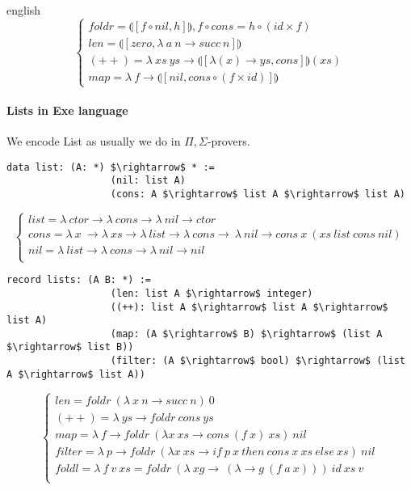 \documentclass{abstract}
\begin{document}
\begin{theses}{english}
$$
\begin{cases}
 foldr = \llparenthesis [ f \circ nil , h] \rrparenthesis, f \circ cons = h \circ (id \times f)\\
 len = \llparenthesis [ zero, \lambda\ a\ n \rightarrow succ\ n ] \rrparenthesis \\
 (++) = \lambda\ xs\ ys \rightarrow \llparenthesis [ \lambda (x) \rightarrow ys, cons ] \rrparenthesis (xs) \\
 map = \lambda\ f \rightarrow \llparenthesis [ nil, cons \circ (f \times id)] \rrparenthesis
\end{cases}
$$

  \paragraph{Lists in Exe language}
  
  We encode List as usually we do in $\Pi,\Sigma$-provers.

\begin{lstlisting}[mathescape=true]
             data list: (A: *) $\rightarrow$ * :=
                  (nil: list A)
                  (cons: A $\rightarrow$ list A $\rightarrow$ list A)
\end{lstlisting}

$$
\begin{cases}
list = \lambda\ ctor \rightarrow \lambda\ cons \rightarrow \lambda\ nil \rightarrow ctor\\
cons = \lambda\ x\ \rightarrow \lambda\ xs \rightarrow \lambda\ list \rightarrow \lambda\ cons \rightarrow\ \lambda\ nil \rightarrow cons\ x\ (xs\ list\ cons\ nil)\\
nil = \lambda\ list \rightarrow \lambda\ cons \rightarrow \lambda\ nil \rightarrow nil\\
\end{cases}
$$

\begin{lstlisting}[mathescape=true]
           record lists: (A B: *) :=
                  (len: list A $\rightarrow$ integer)
                  ((++): list A $\rightarrow$ list A $\rightarrow$ list A)
                  (map: (A $\rightarrow$ B) $\rightarrow$ (list A $\rightarrow$ list B))
                  (filter: (A $\rightarrow$ bool) $\rightarrow$ (list A $\rightarrow$ list A))
\end{lstlisting}
$$
\begin{cases}
len = foldr\ (\lambda\ x\ n \rightarrow succ\ n)\ 0\\
(++) = \lambda\ ys \rightarrow foldr\ cons\ ys\\
map = \lambda\ f \rightarrow foldr\ (\lambda x\ xs \rightarrow cons\ (f\ x)\ xs)\ nil\\
filter = \lambda\ p \rightarrow foldr\ (\lambda x\ xs \rightarrow if\ p\ x\ then\ cons\ x\ xs\ else\ xs)\ nil\\
foldl = \lambda\ f\ v\ xs = foldr\ (\lambda\ xg\rightarrow\ (\lambda \rightarrow g\ (f\ a\ x)))\ id\ xs\ v\\
\end{cases}
$$


\end{theses}
\end{document}
